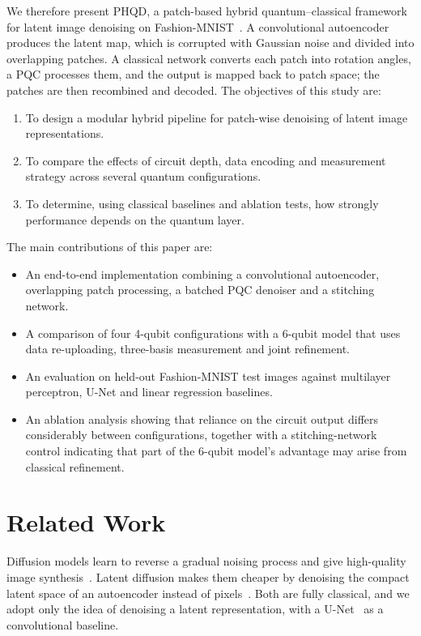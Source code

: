 \documentclass[runningheads]{llncs}
\begin{document}
We therefore present PHQD, a patch-based hybrid quantum--classical framework for latent image denoising on Fashion-MNIST~\cite{fmnist}. A convolutional autoencoder produces the latent map, which is corrupted with Gaussian noise and divided into overlapping patches. A classical network converts each patch into rotation angles, a PQC processes them, and the output is mapped back to patch space; the patches are then recombined and decoded. The objectives of this study are:
\begin{enumerate}
\item To design a modular hybrid pipeline for patch-wise denoising of latent image representations.
\item To compare the effects of circuit depth, data encoding and measurement strategy across several quantum configurations.
\item To determine, using classical baselines and ablation tests, how strongly performance depends on the quantum layer.
\end{enumerate}

The main contributions of this paper are:
\begin{itemize}
\item An end-to-end implementation combining a convolutional autoencoder, overlapping patch processing, a batched PQC denoiser and a stitching network.
\item A comparison of four 4-qubit configurations with a 6-qubit model that uses data re-uploading, three-basis measurement and joint refinement.
\item An evaluation on held-out Fashion-MNIST test images against multilayer perceptron, U-Net and linear regression baselines.
\item An ablation analysis showing that reliance on the circuit output differs considerably between configurations, together with a stitching-network control indicating that part of the 6-qubit model's advantage may arise from classical refinement.
\end{itemize}


\section{Related Work}\label{sec:related}
Diffusion models learn to reverse a gradual noising process and give high-quality image synthesis~\cite{ho}. Latent diffusion makes them cheaper by denoising the compact latent space of an autoencoder instead of pixels~\cite{rombach}. Both are fully classical, and we adopt only the idea of denoising a latent representation, with a U-Net~\cite{unet} as a convolutional baseline.
\end{document}
